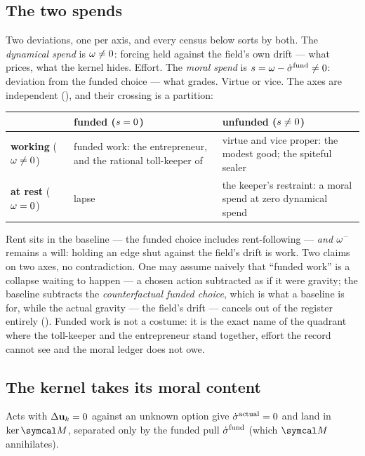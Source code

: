 \documentclass[../main]{subfiles}
\begin{document}
\subsection{The two spends}
\label{subsec:good:spends}
%
Two deviations, one per axis, and every census below sorts by both. The
\emph{dynamical spend} is $\omega\neq0$: forcing held against the field's own drift ---
what  prices, what the kernel hides. Effort. The \emph{moral spend} is
$s=\omega-\dot{\sigma}\sp{\mathrm{fund}}\neq0$: deviation from the funded choice --- what
 grades. Virtue or vice. The axes are independent
(), and their crossing is a partition:

\begin{table}[htbp]
  \centering
  \begin{tabularx}{\textwidth}{@{} l L L @{}}
    \toprule
    & \textbf{funded} ($s=0$) & \textbf{unfunded} ($s\neq0$) \\
    \midrule
    \textbf{working} ($\omega\neq0$) & funded work: the entrepreneur, and the rational
      toll-keeper of  & virtue and vice proper: the modest good; the
      spiteful sealer \\
    \addlinespace
    \textbf{at rest} ($\omega=0$) & lapse & the keeper's restraint: a moral spend at
      zero dynamical spend \\
    \bottomrule
  \end{tabularx}
\end{table}

Rent sits in the baseline --- the funded choice includes rent-following --- \emph{and}
$\omega\sp{-}$ remains a will: holding an edge shut against the field's drift is work.
Two claims on two axes, no contradiction. One may assume naively that ``funded work''
is a collapse waiting to happen --- a chosen action subtracted as if it were gravity;
the baseline subtracts the \emph{counterfactual funded choice}, which is what a
baseline is for, while the actual gravity --- the field's drift --- cancels out of the
register entirely (). Funded work is not a costume: it is
the exact name of the quadrant where the toll-keeper and the entrepreneur stand
together, effort the record cannot see and the moral ledger does not owe.

\subsection{The kernel takes its moral content}
\label{subsec:good:kernel}
%
%
Acts with $\Delta\mathbf{u}\sb{k}=0$ against an unknown option give $\dot{\sigma}\sp{\mathrm{actual}}=0$ and
land in $\ker\readout$, separated only by the funded pull $\dot{\sigma}\sp{\mathrm{fund}}$ (which
$\readout$ annihilates).
\end{document}
